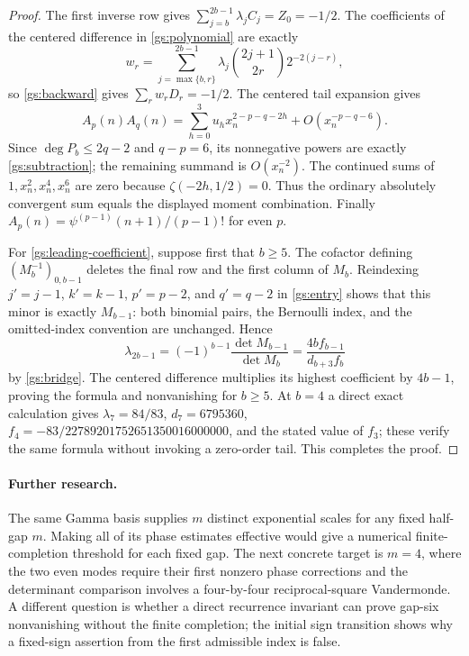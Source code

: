 \documentclass[11pt,a4paper]{article}
\theoremstyle{definition}
\theoremstyle{remark}
\numberwithin{equation}{section}
\begin{document}
\begin{proof}
The first inverse row gives
$\sum_{j=b}^{2b-1}\lambda_jC_j=Z_0=-1/2$.
The coefficients of the centered difference in
\eqref{gs:polynomial} are exactly
\[
 w_r=\sum_{j=\max\{b,r\}}^{2b-1}
       \lambda_j\binom{2j+1}{2r}2^{-2(j-r)},
\]
so \eqref{gs:backward} gives $\sum_rw_rD_r=-1/2$.
The centered tail expansion gives
\[
 A_p(n)A_q(n)=\sum_{h=0}^3u_hx_n^{2-p-q-2h}
                       +O(x_n^{-p-q-6}).
\]
Since $\deg P_b\le2q-2$ and $q-p=6$, its nonnegative powers
are exactly \eqref{gs:subtraction}; the remaining summand is
$O(x_n^{-2})$.  The continued sums of $1,x_n^2,x_n^4,x_n^6$
are zero because $\zeta(-2h,1/2)=0$.  Thus the ordinary
absolutely convergent sum equals the displayed moment combination.
Finally $A_p(n)=\psi^{(p-1)}(n+1)/(p-1)!$ for even $p$.

For \eqref{gs:leading-coefficient}, suppose first that $b\ge5$.
The cofactor defining $(M_b^{-1})_{0,b-1}$ deletes the final row
and the first column of $M_b$.  Reindexing $j'=j-1$, $k'=k-1$,
$p'=p-2$, and $q'=q-2$ in \eqref{gs:entry} shows that this
minor is exactly $M_{b-1}$: both binomial pairs, the Bernoulli
index, and the omitted-index convention are unchanged.  Hence
\[
 \lambda_{2b-1}=(-1)^{b-1}\frac{\det M_{b-1}}{\det M_b}
              =\frac{4bf_{b-1}}{d_{b+3}f_b}
\]
by \eqref{gs:bridge}.  The centered difference multiplies its
highest coefficient by $4b-1$, proving the formula and
nonvanishing for $b\ge5$.  At $b=4$ a direct exact calculation
gives $\lambda_7=84/83$, $d_7=6795360$,
$f_4=-83/22789201752651350016000000$, and the stated value of
$f_3$; these verify the same formula without invoking a
zero-order tail.  This completes the proof.
\end{proof}

\paragraph{Further research.}
The same Gamma basis supplies $m$ distinct exponential scales for
any fixed half-gap $m$.  Making all of its phase estimates effective
would give a numerical finite-completion threshold for each fixed
gap.  The next concrete target is $m=4$, where the two even modes
require their first nonzero phase corrections and the determinant
comparison involves a four-by-four reciprocal-square Vandermonde.
A different question is whether a direct recurrence invariant can
prove gap-six nonvanishing without the finite completion; the initial
sign transition shows why a fixed-sign assertion from the first
admissible index is false.
\end{document}
